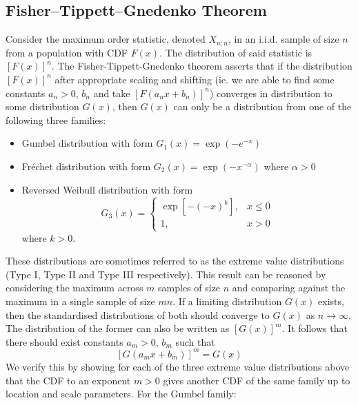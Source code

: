 \documentclass[11pt]{report} %
\begin{document}
\subsection{Fisher–Tippett–Gnedenko Theorem \cite{David2005}}

Consider the maximum order statistic, denoted $X_{n:n}$, in an i.i.d. sample of size $n$ from a population with CDF $F\left(x\right)$. The distribution of said statistic is $\left[F\left(x\right)\right]^{n}$. The Fisher-Tippett-Gnedenko theorem asserts that if the distribution $\left[F\left(x\right)\right]^{n}$ after appropriate scaling and shifting (ie. we are able to find some constants $a_{n} > 0$, $b_{n}$ and take $\left[F\left(a_{n}x + b_{n}\right)\right]^{n}$) converges in distribution to some distribution $G\left(x\right)$, then $G\left(x\right)$ can only be a distribution from one of the following three families:
\begin{itemize}
\item Gumbel distribution with form $G_{1}\left(x\right) = \exp\left(-e^{-x}\right)$
\item Fr\'{e}chet distribution with form $G_{2}\left(x\right) = \exp\left(-x^{-\alpha}\right)$ where $\alpha > 0$
\item Reversed Weibull distribution with form
\begin{equation}
G_{3}\left(x\right) = \begin{cases} \exp\left[-\left(-x\right)^{k}\right], & x \leq 0 \\ 1, & x > 0 \end{cases}
\end{equation}
where $k > 0$.
\end{itemize}
These distributions are sometimes referred to as the extreme value distributions (Type I, Type II and Type III respectively). This result can be reasoned by considering the maximum across $m$ samples of size $n$ and comparing against the maximum in a single sample of size $mn$. If a limiting distribution $G\left(x\right)$ exists, then the standardised distributions of both should converge to $G\left(x\right)$ as $n \to \infty$. The distribution of the former can also be written as $\left[G\left(x\right)\right]^{m}$. It follows that there should exist constants $a_{m} > 0$, $b_{m}$ such that
\begin{equation}
\left[G\left(a_{m}x + b_{m}\right)\right]^{m} = G\left(x\right)
\end{equation}
We verify this by showing for each of the three extreme value distributions above that the CDF to an exponent $m > 0$ gives another CDF of the same family up to location and scale parameters. For the Gumbel family:
\end{document}

